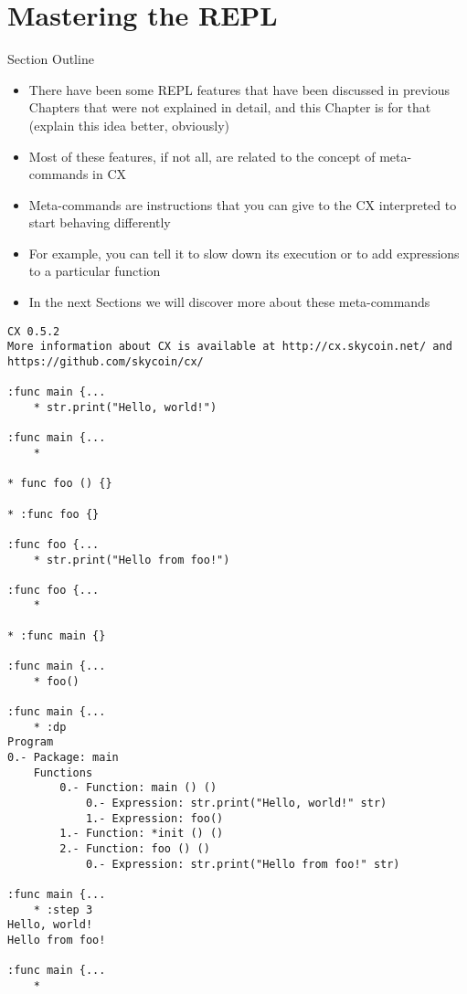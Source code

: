 \documentclass[11pt,fleqn,openany]{book} %
\begin{document}

\chapter{Mastering the REPL}
\label{chapter:mastering-the-repl}

\begin{remark}
Section Outline
    \begin{itemize}
    	\item There have been some REPL features that have been discussed in previous Chapters that were not explained in detail, and this Chapter is for that (explain this idea better, obviously)
        \item Most of these features, if not all, are related to the concept of meta-commands in CX
        \item Meta-commands are instructions that you can give to the CX interpreted to start behaving differently
        \item For example, you can tell it to slow down its execution or to add expressions to a particular function
        \item In the next Sections we will discover more about these meta-commands
    \end{itemize}
\end{remark}

\begin{lstlisting}[caption={REPL Session Example},captionpos=b,label={listing:repl-session}]
CX 0.5.2
More information about CX is available at http://cx.skycoin.net/ and https://github.com/skycoin/cx/

:func main {...
	* str.print("Hello, world!")

:func main {...
	* 

* func foo () {}

* :func foo {}

:func foo {...
	* str.print("Hello from foo!")

:func foo {...
	* 

* :func main {}

:func main {...
	* foo()

:func main {...
	* :dp
Program
0.- Package: main
	Functions
		0.- Function: main () ()
			0.- Expression: str.print("Hello, world!" str)
			1.- Expression: foo()
		1.- Function: *init () ()
		2.- Function: foo () ()
			0.- Expression: str.print("Hello from foo!" str)

:func main {...
	* :step 3
Hello, world!
Hello from foo!

:func main {...
	* 
\end{lstlisting}
\end{document}
